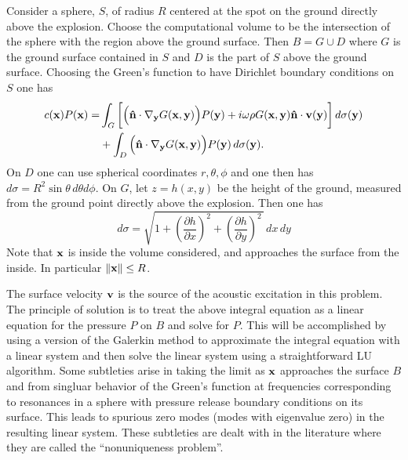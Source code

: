 Consider a sphere, $S$, of radius $R$ centered at the spot on the ground directly above the explosion. Choose the computational volume to be the intersection of the sphere with the region above the ground surface. Then $B=G\cup D$ where $G$ is the ground surface contained in $S$ and $D$ is the part of $S$ above the ground surface. Choosing the Green's function to have Dirichlet boundary conditions on $S$ one has
\begin{equation}\label{eq:kirk_helm_domain_dir_sphere}
\begin{aligned}
c({\bf x})P({\bf x})
=&
\int_{G} \bigg[
\Big({\bf \hat n}\cdot\nabla_{\bf y} G({\bf x},{\bf y})\Big)P({\bf y})
+
i\omega\rho G({\bf x},{\bf y}){\bf \hat n}\cdot{\bf v}({\bf y})
\bigg]\, d\sigma({\bf y})\\
&+
\int_{D} 
\Big({\bf \hat n}\cdot\nabla_{\bf y} G({\bf x},{\bf y})\Big)P({\bf y})
\, d\sigma({\bf y}).
\end{aligned}
\end{equation}
On $D$ one can use spherical coordinates $r,\theta,\phi$ and one then has $d\sigma=R^2\sin\theta\, d\theta d\phi$. On $G$, let $z=h(x,y)$ be the height of the ground, measured from the ground point directly above the explosion. Then one has 
\begin{equation}\label{eq:gnd_surface_element}
d\sigma=\sqrt{1+(\frac{\partial h}{\partial x})^2+(\frac{\partial h}{\partial y})^2\,}\, dx\, dy
\end{equation}
Note that ${\bf x}$ is inside the volume considered, and approaches the surface from the inside. In particular $\|{\bf x}\|\le R$. 

The surface velocity ${\bf v}$ is the source of the acoustic excitation in this problem. The principle of solution is to treat the above integral equation as a linear equation for the pressure $P$ on $B$ and solve for $P$. \cite{schenck1968improved,bai2013acoustic} This will be accomplished by using a version of the Galerkin method to approximate the integral equation with a linear system and then solve the linear system using a straightforward LU algorithm. Some subtleties arise in taking the limit as ${\bf x}$ approaches the surface $B$ and from singluar behavior of the Green's function at frequencies corresponding to resonances in a sphere with pressure release boundary conditions on its surface. This leads to spurious zero modes (modes with eigenvalue zero) in the resulting linear system. These subtleties are dealt with in the literature where they are called the ``nonuniqueness problem''. \cite{schenck1968improved} 

